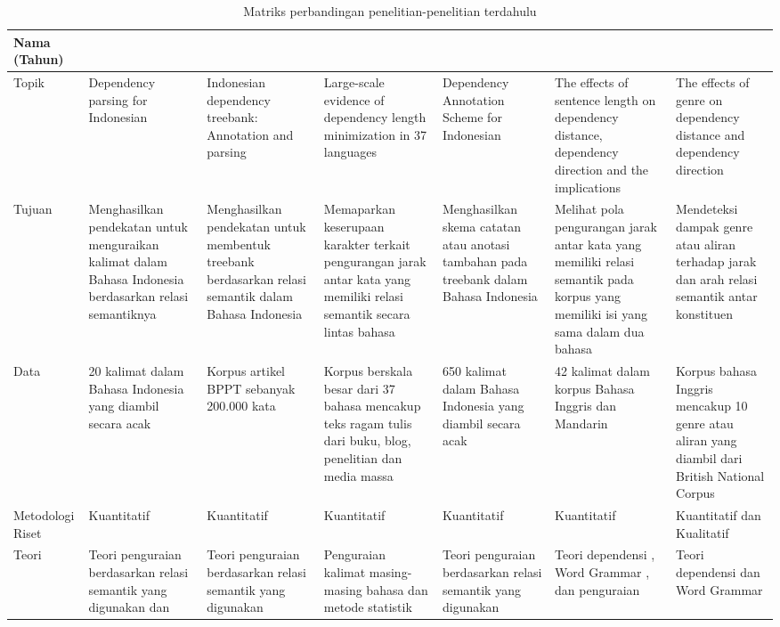 \pagestyle{empty}
\begin{landscape}
\begin{table}[htbp]
\caption{Matriks perbandingan penelitian-penelitian terdahulu}\label{tab:penelitianterdahulu}
\begin{scriptsize}
\begin{center}
\begin{tabular}{| p{2cm} | p{3cm} | p{3cm} | p{3cm} | p{3cm} | p{3cm} | p{3cm} |}
\hline
Nama (Tahun) & \cite{kamayani2011dependency} & \cite{green2012indonesian} & \cite{futrell2015large} & \cite{irmawati2015dependency} & \cite{jiang2015effects} & \cite{wang2017effects} \\ \hline
Topik & Dependency parsing for Indonesian & Indonesian dependency treebank: Annotation and parsing & Large-scale evidence of dependency length minimization in 37 languages & Dependency Annotation Scheme for Indonesian & The effects of sentence length on dependency distance, dependency direction and the implications & The effects of genre on dependency distance and dependency direction \\ \hline
Tujuan & Menghasilkan pendekatan untuk menguraikan kalimat dalam Bahasa Indonesia berdasarkan relasi semantiknya & Menghasilkan pendekatan untuk membentuk treebank berdasarkan relasi semantik dalam Bahasa Indonesia & Memaparkan keserupaan karakter terkait pengurangan jarak antar kata yang memiliki relasi semantik secara lintas bahasa & Menghasilkan skema catatan atau anotasi tambahan pada treebank dalam Bahasa Indonesia & Melihat pola pengurangan jarak antar kata yang memiliki relasi semantik pada korpus yang memiliki isi yang sama dalam dua bahasa & Mendeteksi dampak genre atau aliran terhadap jarak dan arah relasi semantik antar konstituen \\ \hline
Data & 20 kalimat dalam Bahasa Indonesia yang diambil secara acak & Korpus artikel BPPT sebanyak 200.000 kata & Korpus berskala besar dari 37 bahasa mencakup teks ragam tulis dari  buku, blog, penelitian dan media massa & 650 kalimat dalam Bahasa Indonesia yang diambil secara acak & 42 kalimat dalam korpus Bahasa Inggris dan Mandarin & Korpus bahasa Inggris mencakup 10 genre atau aliran yang diambil dari British National Corpus \\ \hline
Metodologi Riset & Kuantitatif & Kuantitatif & Kuantitatif & Kuantitatif & Kuantitatif & Kuantitatif dan Kualitatif \\ \hline
Teori & Teori penguraian berdasarkan relasi semantik yang digunakan \cite{covington2001fundamental} dan \cite{nivre2004incrementality} & Teori penguraian berdasarkan relasi semantik yang digunakan \cite{nivre2006dependency} & Penguraian kalimat masing-masing bahasa dan metode statistik \cite{gelman2007data} & Teori penguraian berdasarkan relasi semantik yang digunakan \cite{nivre2006dependency} & Teori dependensi \cite{tesniere1959elements}, Word Grammar \cite{hudson1984word}, dan penguraian \cite{nivre2006dependency} & Teori dependensi \cite{tesniere1959elements} dan Word Grammar \cite{hudson1984word} \\ \hline

\end{tabular}
\end{center}
\end{scriptsize}
\end{table}
\end{landscape}
